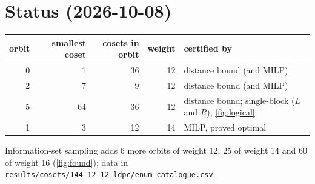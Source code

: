 \documentclass[11pt]{article}
\begin{document}
\section*{Status (2026-10-08)}
\begin{center}
\begin{tabular}{rrrrl}
\toprule
orbit & smallest coset & cosets in orbit & weight & certified by \\
\midrule
0 & 1  & 36 & 12 & distance bound (and MILP) \\
2 & 7  & 9  & 12 & distance bound (and MILP) \\
5 & 64 & 36 & 12 & distance bound; single-block ($L$ and $R$), \cref{fig:logical} \\
1 & 3  & 12 & 14 & MILP, proved optimal \\
\bottomrule
\end{tabular}
\end{center}
Information-set sampling adds 6 more orbits of weight 12, 25 of weight 14 and 60 of weight 16
(\cref{fig:found}); data in \texttt{results/cosets/144\_12\_12\_ldpc/enum\_catalogue.csv}.
\end{document}
